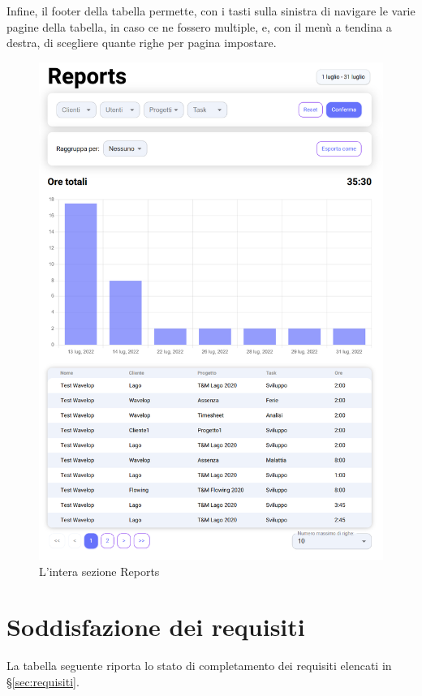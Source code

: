 Infine, il footer della tabella permette, con i tasti sulla sinistra di navigare le varie pagine della tabella, in caso ce ne fossero multiple, e, con il menù a tendina a destra, di scegliere quante righe per pagina impostare.
\clearpage
\begin{figure}[H]
	\includegraphics[width = \textwidth]{immagini/full reports.png}
	\caption{L'intera sezione Reports}
	\label{fig:report_full}
\end{figure}


\section{Soddisfazione dei requisiti}
La tabella seguente riporta lo stato di completamento dei requisiti elencati in \S\ref{sec:requisiti}.

